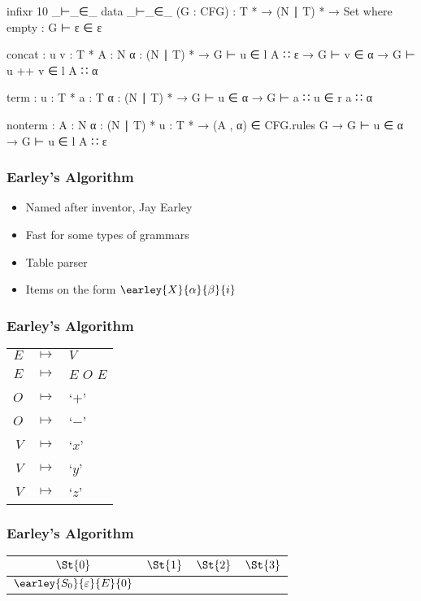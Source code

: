 \begin{frame}
	\begin{code}
		infixr 10 _⊢_∈_
		data _⊢_∈_ (G : CFG) :  T * → (N ∣ T) * → Set where
		  empty :
		    G ⊢ ε ∈ ε

		  concat : {u v : T *} {A : N} {α : (N ∣ T) *} →
		    G ⊢ u ∈ l A ∷ ε → G ⊢ v ∈ α → G ⊢ u ++ v ∈ l A ∷ α

		  term : {u : T *} {a : T} {α : (N ∣ T) *} →
		    G ⊢ u ∈ α → G ⊢ a ∷ u ∈ r a ∷ α

		  nonterm : {A : N} {α : (N ∣ T) *} {u : T *} →
		    (A , α) ∈ CFG.rules G → G ⊢ u ∈ α → G ⊢ u ∈ l A ∷ ε
	\end{code}
\end{frame}

\begin{frame}
	\frametitle{Earley's Algorithm}

	\begin{itemize}
		\item Named after inventor, Jay Earley
		\item Fast for some types of grammars
		\item Table parser
		\item Items on the form $\earley{X}{\alpha}{\beta}{i}$
	\end{itemize}
\end{frame}

\begin{frame}
	\frametitle{Earley's Algorithm}
	\centering
	\begin{tabular}{rcl}
		$E$ & $ \mapsto $ & $V$ \\
		$E$ & $ \mapsto $ & $E$ $O$ $E$ \\
		$O$ & $ \mapsto $ & `$+$' \\
		$O$ & $ \mapsto $ & `$-$' \\
		$V$ & $ \mapsto $ & `$x$' \\
		$V$ & $ \mapsto $ & `$y$' \\
		$V$ & $ \mapsto $ & `$z$'
	\end{tabular}
\end{frame}

\begin{frame}
	\frametitle{Earley's Algorithm}
	\centering
	\begin{tabular}{|c|c|c|c|}
		\hline
		$\St{0}$ & $\St{1}$ & $\St{2}$ & $\St{3}$ \\
		\hline
		$\earley{S_0}{\varepsilon}{E}{0}$ & & & \\
		\hline
	\end{tabular}
\end{frame}

